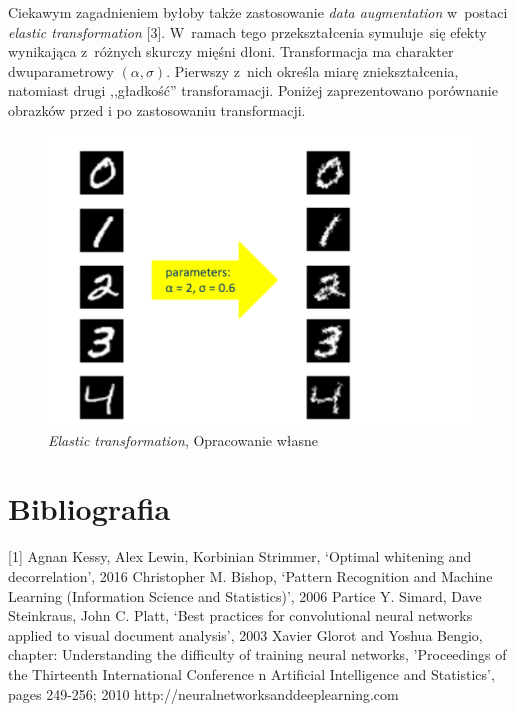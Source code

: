 \documentclass[11pt, a4paper]{article}
\begin{document}
 Ciekawym zagadnieniem byłoby także zastosowanie \textit{data augmentation} w~postaci \textit{elastic transformation} [3]. W~ramach tego przekształcenia symuluje~się efekty wynikająca z~różnych skurczy mięśni dłoni. Transformacja ma charakter dwuparametrowy \((\alpha, \sigma)\). Pierwszy z~nich określa miarę zniekształcenia, natomiast drugi ,,gładkość'' transforamacji. Poniżej zaprezentowano porównanie obrazków przed i po zastosowaniu transformacji.\newline
 
 \begin{figure}[H]
  \centering
    \includegraphics[scale=0.5]{elastic_transformation.png}
    \caption{\textit{Elastic transformation}, Opracowanie własne}
 \end{figure}

\section{Bibliografia}
[1] Agnan Kessy, Alex Lewin, Korbinian Strimmer, ‘Optimal whitening and decorrelation’, 2016 \newline
[2] Christopher M. Bishop, ‘Pattern Recognition and Machine Learning (Information Science and Statistics)’, 2006 \newline
[3] Partice Y. Simard, Dave Steinkraus, John C. Platt, ‘Best practices for convolutional neural networks applied to visual document analysis’, 2003 \newline
[4] Xavier Glorot and Yoshua Bengio, chapter: Understanding the difficulty of training neural networks, 'Proceedings of the Thirteenth International Conference n Artificial Intelligence and Statistics', pages 249-256; 2010 \newline
[5] http://neuralnetworksanddeeplearning.com
\end{document}
